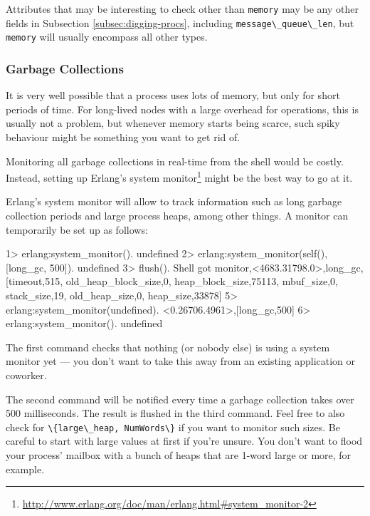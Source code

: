 \documentclass[11pt, oneside]{book}   	%
\newcommand{\expression}[1]{\Verb`#1`}
\newcommand{\term}[1]{\Verb`#1`}
\begin{document}
Attributes that may be interesting to check other than \term{memory} may be any other fields in Subsection \ref{subsec:digging-procs}, including \term{message\_queue\_len}, but \term{memory} will usually encompass all other types.

\subsubsection{Garbage Collections}
\label{subsubsec:leak-gc}

It is very well possible that a process uses lots of memory, but only for short periods of time. For long-lived nodes with a large overhead for operations, this is usually not a problem, but whenever memory starts being scarce, such spiky behaviour might be something you want to get rid of.

Monitoring all garbage collections in real-time from the shell would be costly. Instead, setting up Erlang's system monitor\footnote{\href{http://www.erlang.org/doc/man/erlang.html\#system\_monitor-2}{http://www.erlang.org/doc/man/erlang.html\#system\_monitor-2}} might be the best way to go at it.

Erlang's system monitor will allow to track information such as long garbage collection periods and large process heaps, among other things. A monitor can temporarily be set up as follows:

\begin{VerbatimEshell}
1> erlang:system_monitor().
undefined
2> erlang:system_monitor(self(), [{long_gc, 500}]).
undefined
3> flush().
Shell got {monitor,<4683.31798.0>,long_gc,
                   [{timeout,515},
                    {old_heap_block_size,0},
                    {heap_block_size,75113},
                    {mbuf_size,0},
                    {stack_size,19},
                    {old_heap_size,0},
                    {heap_size,33878}]}
5> erlang:system_monitor(undefined).
{<0.26706.4961>,[{long_gc,500}]}
6> erlang:system_monitor().
undefined
\end{VerbatimEshell}

The first command checks that nothing (or nobody else) is using a system monitor yet — you don't want to take this away from an existing application or coworker.

The second command will be notified every time a garbage collection takes over 500 milliseconds. The result is flushed in the third command. Feel free to also check for \expression{\{large\_heap, NumWords\}} if you want to monitor such sizes.
Be careful to start with large values at first if you're unsure. You don't want to flood your process' mailbox with a bunch of heaps that are 1-word large or more, for example.
\end{document}
